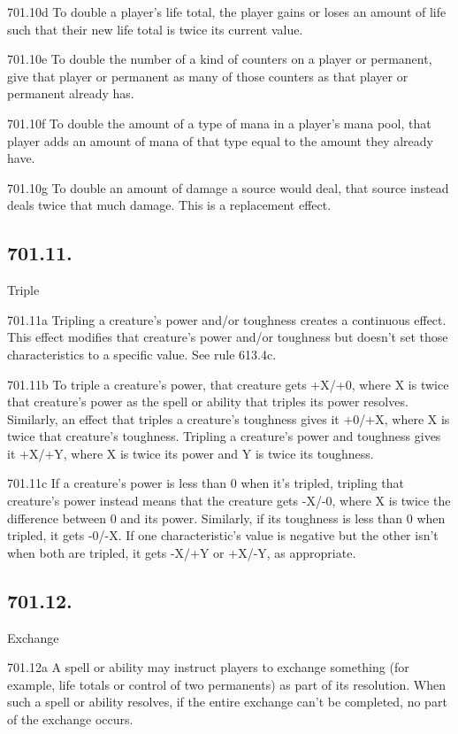 701.10d To double a player’s life total, the player gains or loses an amount of life such that their new life total is twice its current value.

701.10e To double the number of a kind of counters on a player or permanent, give that player or permanent as many of those counters as that player or permanent already has.

701.10f To double the amount of a type of mana in a player’s mana pool, that player adds an amount of mana of that type equal to the amount they already have.

701.10g To double an amount of damage a source would deal, that source instead deals twice that much damage. This is a replacement effect.

\subsection*{701.11.}
Triple

701.11a Tripling a creature’s power and/or toughness creates a continuous effect. This effect modifies that creature’s power and/or toughness but doesn’t set those characteristics to a specific value. See rule 613.4c.

701.11b To triple a creature’s power, that creature gets +X/+0, where X is twice that creature’s power as the spell or ability that triples its power resolves. Similarly, an effect that triples a creature’s toughness gives it +0/+X, where X is twice that creature’s toughness. Tripling a creature’s power and toughness gives it +X/+Y, where X is twice its power and Y is twice its toughness.

701.11c If a creature’s power is less than 0 when it’s tripled, tripling that creature’s power instead means that the creature gets -X/-0, where X is twice the difference between 0 and its power. Similarly, if its toughness is less than 0 when tripled, it gets -0/-X. If one characteristic’s value is negative but the other isn’t when both are tripled, it gets -X/+Y or +X/-Y, as appropriate.

\subsection*{701.12.}
Exchange

701.12a A spell or ability may instruct players to exchange something (for example, life totals or control of two permanents) as part of its resolution. When such a spell or ability resolves, if the entire exchange can’t be completed, no part of the exchange occurs.

